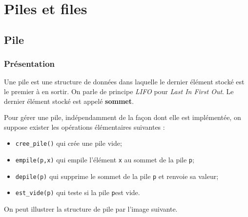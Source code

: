 \setchapterpreamble[u]{\margintoc}

\chapter{Piles et files}
%


\section{Pile}
\subsection{Présentation}
\begin{defi}[Pile]
Une pile est une structure de données dans laquelle le dernier élément stocké est le premier à en sortir. On parle de principe \textit{LIFO} pour \textit{Last In First Out}. Le dernier élément stocké est appelé \textbf{sommet}.
\end{defi}

Pour gérer une pile, indépendamment de la façon dont elle est implémentée, on suppose exister les opérations élémentaires suivantes : 
\begin{itemize}
\item \lstinline{cree_pile()} qui crée une pile vide;
\item \lstinline{empile(p,x)} qui empile l'élément \lstinline{x} au sommet de la pile \lstinline{p};
\item \lstinline{depile(p)} qui supprime le sommet de la pile \lstinline{p} et renvoie sa valeur;
\item \lstinline{est_vide(p)} qui teste si la pile \lstinline{p}est vide.
\end{itemize}

On peut illustrer la structure de pile par l'image suivante.

